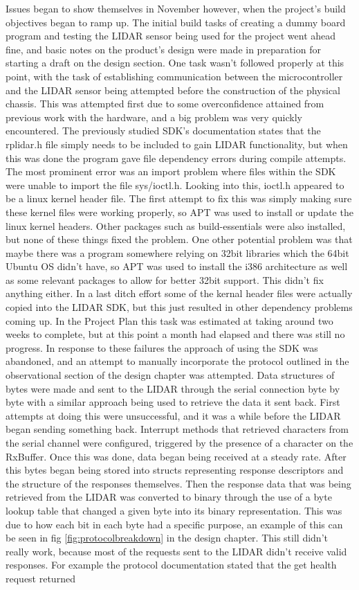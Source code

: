 		Issues began to show themselves in November however, when the project's build objectives began to ramp up. The initial build tasks of creating a dummy board program and testing the LIDAR sensor being used for the project went ahead fine, and basic notes on the product's design were made in preparation for starting a draft on the design section. One task wasn't followed properly at this point, with the task of establishing communication between the microcontroller and the LIDAR sensor being attempted before the construction of the physical chassis. This was attempted first due to some overconfidence attained from previous work with the hardware, and a big problem was very quickly encountered. The previously studied SDK's documentation states that the rplidar.h file simply needs to be included to gain LIDAR functionality, but when this was done the program gave file dependency errors during compile attempts. The most prominent error was an import problem where files within the SDK were unable to import the file sys/ioctl.h. Looking into this, ioctl.h appeared to be a linux kernel header file. The first attempt to fix this was simply making sure these kernel files were working properly, so APT was used to install or update the linux kernel headers. Other packages such as build-essentials were also installed, but none of these things fixed the problem. One other potential problem was that maybe there was a program somewhere relying on 32bit libraries which the 64bit Ubuntu OS didn't have, so APT was used to install the i386 architecture as well as some relevant packages to allow for better 32bit support. This didn't fix anything either. In a last ditch effort some of the kernal header files were actually copied into the LIDAR SDK, but this just resulted in other dependency problems coming up.	In the Project Plan this task was estimated at taking around two weeks to complete, but at this point a month had elapsed and there was still no progress. In response to these failures the approach of using the SDK was abandoned, and an attempt to manually incorporate the protocol outlined in the observational section of the design chapter was attempted. Data structures of bytes were made and sent to the LIDAR through the serial connection byte by byte with a similar approach being used to retrieve the data it sent back. First attempts at doing this were unsuccessful, and it was a while before the LIDAR began sending something back. Interrupt methods that retrieved characters from the serial channel were configured, triggered by the presence of a character on the RxBuffer. Once this was done, data began being received at a steady rate. After this bytes began being stored into structs representing response descriptors and the structure of the responses themselves. Then the response data that was being retrieved from the LIDAR was converted to binary through the use of a byte lookup table that changed a given byte into its binary representation. This was due to how each bit in each byte had a specific purpose, an example of this can be seen in fig \ref{fig:protocolbreakdown} in the design chapter. This still didn't really work, because most of the requests sent to the LIDAR didn't receive valid responses. For example the protocol documentation stated that the get health request returned 